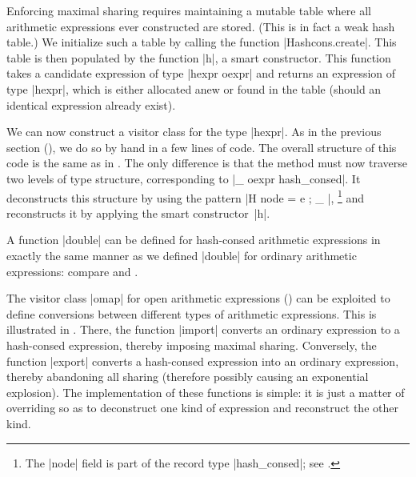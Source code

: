 \documentclass[11pt,a4paper,twoside]{article}
\begin{document}
Enforcing maximal sharing requires maintaining a mutable table where all
arithmetic expressions ever constructed are stored. (This is in fact a weak
hash table.) We initialize such a table by calling the function
\oc|Hashcons.create|. This table is then populated by the function \oc|h|, a smart
constructor.
This function takes a candidate expression of type \oc|hexpr oexpr| and
returns an expression of type \oc|hexpr|, which is either allocated anew
or found in the table (should an identical expression already exist).

We can now construct a visitor class for the type \oc|hexpr|. As in the previous
section (), we do so by hand in a few lines of code.
%
%
%
The overall structure of this code is the same as in . The
only difference is that the method  must now traverse
two levels of type structure, corresponding to \oc|_ oexpr hash_consed|.
It deconstructs this structure by using the pattern \oc|H { node = e ; _ }|,%
%
\footnote{The \oc|node| field is part of the record type \oc|hash_consed|;
see .}
%
and reconstructs it by applying the smart constructor~\oc|h|.

A function \oc|double| can be defined for hash-consed arithmetic expressions
in exactly the same manner as we defined \oc|double| for ordinary arithmetic
expressions: compare  and .
%
%

The visitor class \oc|omap| for open arithmetic expressions
() can be exploited to define conversions
between different types of arithmetic expressions.
This is illustrated in .
There, the function \oc|import| converts an ordinary expression
to a hash-consed expression, thereby imposing maximal sharing.
Conversely, the function \oc|export| converts a hash-consed
expression into an ordinary expression, thereby abandoning
all sharing (therefore possibly causing an exponential explosion).
The implementation of these functions is simple: it is just
a matter of overriding  so as to deconstruct
one kind of expression and reconstruct the other kind.
\end{document}
